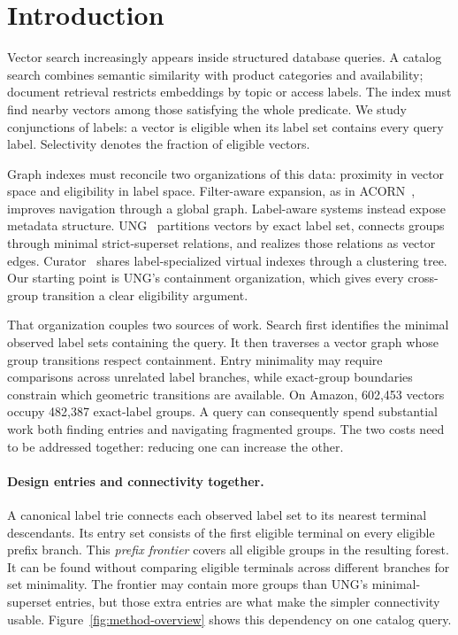 \section{Introduction}
Vector search increasingly appears inside structured database queries.
A catalog search combines semantic similarity with product categories and
availability; document retrieval restricts embeddings by topic or access
labels. The index must find nearby vectors among those satisfying the whole
predicate. We study conjunctions of labels: a vector is eligible when its
label set contains every query label. Selectivity denotes the fraction of
eligible vectors.

Graph indexes must reconcile two organizations of this data: proximity in
vector space and eligibility in label space. Filter-aware expansion, as in
ACORN~\cite{patel2024acorn}, improves navigation through a global graph.
Label-aware systems instead expose metadata structure. UNG~\cite{cai2024ung}
partitions vectors by exact label set, connects groups through minimal
strict-superset relations, and realizes those relations as vector edges.
Curator~\cite{jin2026curator} shares label-specialized virtual indexes through
a clustering tree. Our starting point is UNG's containment organization,
which gives every cross-group transition a clear eligibility argument.

That organization couples two sources of work. Search first identifies the
minimal observed label sets containing the query. It then traverses a vector
graph whose group transitions respect containment. Entry minimality may
require comparisons across unrelated label branches, while exact-group
boundaries constrain which geometric transitions are available. On Amazon,
602,453 vectors occupy 482,387 exact-label groups. A query can consequently
spend substantial work both finding entries and navigating fragmented groups.
The two costs need to be addressed together: reducing one can increase the
other.

\paragraph{Design entries and connectivity together.}
A canonical label trie connects each observed label set to its nearest
terminal descendants. Its entry set consists of the first eligible terminal
on every eligible prefix branch. This \emph{prefix frontier} covers all
eligible groups in the resulting forest. It can be found without comparing
eligible terminals across different branches for set minimality. The frontier
may contain more groups than UNG's minimal-superset entries, but those extra
entries are what make the simpler connectivity usable. Figure~\ref{fig:method-overview}
shows this dependency on one catalog query.

